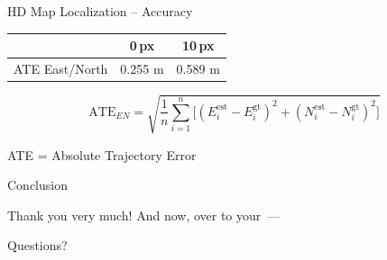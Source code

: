 \documentclass[aspectratio=169]{beamer}
\begin{document}
\begin{frame}{HD Map Localization -- Accuracy} %
  \centering
  \renewcommand{\arraystretch}{1.2}
  \begin{tabular}{lcc}
    \toprule
                                  & \textbf{0\,px} & \textbf{10\,px} \\
    \midrule
    ATE East/North                        & 0.255 m            & 0.589 m            \\
    \bottomrule
  \end{tabular}

  \vspace{0.8em}
  \[
    \mathrm{ATE}_{EN} = \sqrt{\frac{1}{n}\sum_{i=1}^{n}
      \big[(E_i^{\mathrm{est}}-E_i^{\mathrm{gt}})^2 + (N_i^{\mathrm{est}}-N_i^{\mathrm{gt}})^2\big]}
  \]

  {\footnotesize ATE = Absolute Trajectory Error}
\end{frame}

\begin{frame}[standout]
  Conclusion
\end{frame}

\begin{frame}[standout] %
  Thank you very much! And now, over to your~---

  Questions?
\end{frame}
\end{document}
